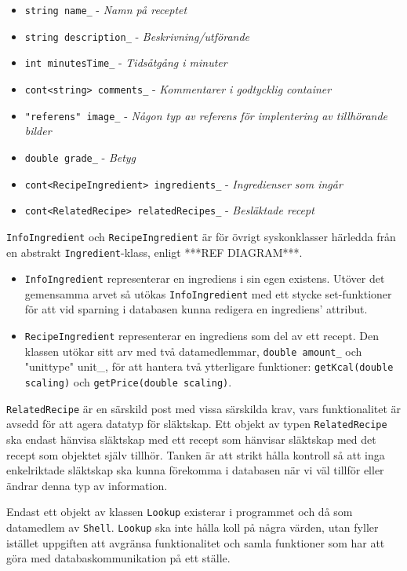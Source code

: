 \begin{itemize}
\item \verb+string name_+ - \emph{Namn på receptet}
\item \verb+string description_+ - \emph{Beskrivning/utförande}
\item \verb+int minutesTime_+ - \emph{Tidsåtgång i minuter}
\item \verb+cont<string> comments_+ - \emph{Kommentarer i godtycklig container}
\item \verb+"referens" image_+ - \emph{Någon typ av referens för implentering av tillhörande bilder}
\item \verb+double grade_+ - \emph{Betyg}
\end{itemize}

\begin{itemize}
\item \verb+cont<RecipeIngredient> ingredients_+ - \emph{Ingredienser som ingår}
\item \verb+cont<RelatedRecipe> relatedRecipes_+ - \emph{Besläktade recept}
\end{itemize}

\verb+InfoIngredient+ och \verb+RecipeIngredient+ är för övrigt syskonklasser härledda från en abstrakt \verb+Ingredient+-klass, enligt ***REF DIAGRAM***.

\begin{itemize}
\item \verb+InfoIngredient+ representerar en ingrediens i sin egen existens. Utöver det gemensamma arvet så utökas \verb+InfoIngredient+ med ett stycke set-funktioner för att vid sparning i databasen kunna redigera en ingrediens' attribut. 
\item \verb+RecipeIngredient+ representerar en ingrediens som del av ett recept. Den klassen utökar sitt arv med två datamedlemmar, \verb+double amount_+ och "unittype" unit_, för att hantera två ytterligare funktioner: \verb+getKcal(double scaling)+ och \verb+getPrice(double scaling)+.
\end{itemize}
 
\verb+RelatedRecipe+ är en särskild post med vissa särskilda krav, vars funktionalitet är avsedd för att agera datatyp för släktskap. Ett objekt av typen \verb+RelatedRecipe+ ska endast hänvisa släktskap med ett recept som hänvisar släktskap med det recept som objektet själv tillhör. Tanken är att strikt hålla kontroll så att inga enkelriktade släktskap ska kunna förekomma i databasen när vi väl tillför eller ändrar denna typ av information.

Endast ett objekt av klassen \verb+Lookup+ existerar i programmet och då som datamedlem av \verb+Shell+. \verb+Lookup+ ska inte hålla koll på några värden, utan fyller istället uppgiften att avgränsa funktionalitet och samla funktioner som har att göra med databaskommunikation på ett ställe.



    

